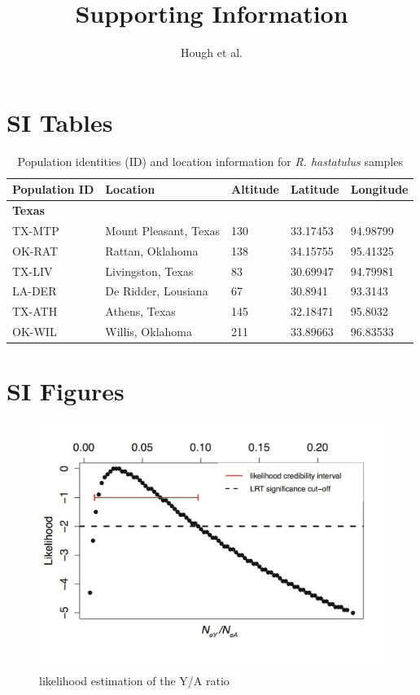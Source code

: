 \documentclass[9pt,onecolumn,twoside]{pnas-new}
\title{Supporting Information}
\author{Hough et al.}
\begin{document}
\maketitle



\section*{SI Tables}

\begin{table}[tbhp!]
\centering
\caption{Population identities (ID) and location information for \textit{R. hastatulus} samples}
\begin{tabular}{lllll}
Population ID & Location & Altitude & Latitude & Longitude \\
\midrule
\textbf{Texas} &  &  &  &  \\
TX-MTP & Mount Pleasant, Texas & 130	 & 33.17453 & 94.98799 \\
OK-RAT & Rattan, Oklahoma & 138 & 34.15755 & 95.41325 \\
TX-LIV & Livingston, Texas & 83 & 30.69947 & 94.79981 \\
LA-DER & De Ridder, Lousiana & 67 & 30.8941 & 93.3143 \\
TX-ATH & Athens, Texas & 145 & 32.18471 & 95.8032 \\
OK-WIL & Willis, Oklahoma & 211 & 33.89663 & 96.83533 \\
\bottomrule
\end{tabular}
\end{table}

\section*{SI Figures}

\begin{figure}[tbhp!]
\centering
\includegraphics[width=.5\linewidth]{FigureS1.png}
\caption{likelihood estimation of the Y/A ratio}
\label{figure:FigureS1}
\end{figure}
\end{document}
